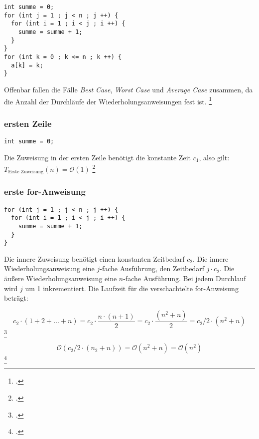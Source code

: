 \documentclass{lehramt-informatik-haupt}
\begin{document}
\begin{verbatim}
int summe = 0;
for (int j = 1 ; j < n ; j ++) {
  for (int i = 1 ; i < j ; i ++) {
    summe = summe + 1;
  }
}
for (int k = 0 ; k <= n ; k ++) {
  a[k] = k;
}
\end{verbatim}

\noindent
Offenbar fallen die Fälle \emph{Best Case}, \emph{Worst Case} und
\emph{Average Case} zusammen, da die Anzahl der Durchläufe der
Wiederholungsanweisungen fest ist.
\footcite[Seite 27 (PDF 19)]{aud:fs:2}

%

\subsubsection{ersten Zeile}

\begin{verbatim}
int summe = 0;
\end{verbatim}

\noindent
Die Zuweisung in der ersten Zeile benötigt die konstante Zeit $c_1$,
also gilt: $T_{\text{Erste Zuweisung}}(n) = \mathcal{O}(1)$
\footcite[Seite 28 (PDF 20)]{aud:fs:2}

%

\subsubsection{erste for-Anweisung}

\begin{verbatim}
for (int j = 1 ; j < n ; j ++) {
  for (int i = 1 ; i < j ; i ++) {
    summe = summe + 1;
  }
}
\end{verbatim}

\noindent
Die innere Zuweisung benötigt einen konstanten Zeitbedarf $c_2$. Die
innere Wiederholungsanweisung eine $j$-fache Ausführung, \dh den
Zeitbedarf $j \cdot c_2$. Die äußere Wiederholungsanweisung eine
$n$-fache Ausführung. Bei jedem Durchlauf wird $j$ um 1 inkrementiert.
Die Laufzeit für die verschachtelte for-Anweisung beträgt:

\begin{displaymath}
c_2 \cdot (1 + 2 + \ldots + n) =
c_2 \cdot \frac{n \cdot (n + 1) }{2} =
c_2 \cdot \frac{(n^2 + n)}{2} =
c_2 / 2 \cdot (n^2 + n)
\end{displaymath}
\footcite{wiki:gausssche-summenformel}

\begin{displaymath}
\mathcal{O}(c_2 / 2 \cdot (n_2 + n)) =
\mathcal{O}(n^2 + n) =
\mathcal{O}(n^2)
\end{displaymath}
\footcite[Seite 29 (PDF 21)]{aud:fs:2}
\end{document}
